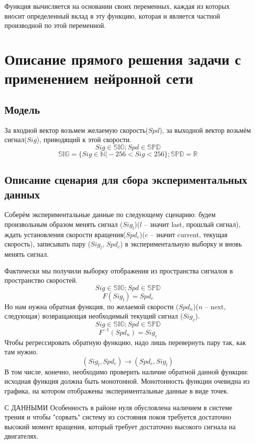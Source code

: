 \documentclass[14pt]{extreport}
\begin{document}
Функция вычисляется на основании своих переменных, каждая из которых вносит определенный вклад в эту функцию, которая и является частной производной по этой переменной.
\newpage
    \chapter{Описание прямого решения задачи с применением нейронной сети}
            \section{Модель}
                За входной вектор возьмем желаемую скорость($Spd$), за выходной вектор возьмём сигнал($Sig$), приводящий к этой скорости.
                \[Sig \in \mathbb{SIG}; Spd \in \mathbb{SPD}\]
                \[\mathbb{SIG} = \{Sig \in \mathbb{N}\vert -256 < Sig < 256\}; \mathbb{SPD} = \mathbb{R}\]
            \section{Описание сценария для сбора экспериментальных данных}
                Соберём экспериментальные данные по следующему сценарию: будем произвольным образом менять сигнал ($Sig_l$)($l$ -- значит last, прошлый сигнал), ждать установления скорости вращения($Spd_c$)($c$ -- значит current, текущая скорость), записывать пару ($Sig_l$, $Spd_c$) в экспериментальную выборку и вновь менять сигнал.

                Фактически мы получили выборку отображения из пространства сигналов в пространство скоростей.
                \[Sig \in \mathbb{SIG}; Spd \in \mathbb{SPD}\]
                \[F(Sig_l) = Spd_c\]
                Но нам нужна обратная функция, по желаемой скорости ($Spd_n$)($n$ -- next, следующая) возвращающая необходимый текущий сигнал ($Sig_c$).
                \[Sig \in \mathbb{SIG}; Spd \in \mathbb{SPD}\]
                \[F^{-1}(Spd_n) = Sig_c\]
                Чтобы регрессировать обратную функцию, надо лишь перевернуть пару так, как там нужно.
                \[(Sig_l, Spd_c) \rightarrow (Spd_c, Sig_l)\]
                В том числе, конечно, необходимо проверить наличие обратной данной функции: исходная функция должна быть монотонной. Монотонность функции очевидна из графика, на котором отображены экспериментальные данные в виде точек.

                { С ДАННЫМИ}
                Особенность в районе нуля обусловлена наличием в системе трения и чтобы "сорвать" систему из состояния покоя требуется достаточно высокий момент вращения, который требует достаточно высокого сигнала на двигателях.
\end{document}
